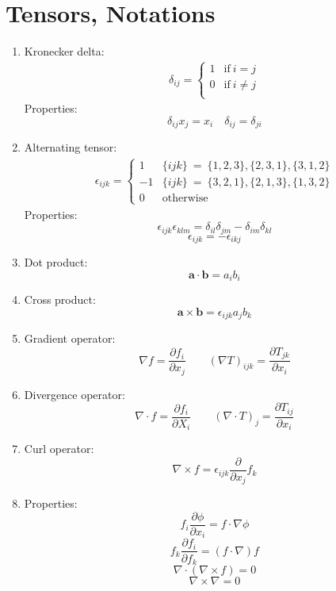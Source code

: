 \documentclass{article}
\begin{document}
\section{Tensors, Notations}
\begin{multicols}{2}
\begin{enumerate}

    \item Kronecker delta: 
    \begin{align*}
    \delta_{ij} = 
        \begin{cases}
            1 & \text{if} \ i=j \\
            0 & \text{if} \ i\neq j \\
        \end{cases}
    \end{align*}
    Properties:
    \[\delta_{ij}x_{j} = x_{i} \quad \delta_{ij}=\delta_{ji}\]
    
    \item Alternating tensor:
    \begin{align*}
    \epsilon_{ijk} = 
        \begin{cases}
            1 & \{ijk\} \ =\ \{1,2,3\}, \{2,3,1\}, \{3,1,2\} \\
            -1 & \{ijk\} \ =\ \{3,2,1\}, \{2,1,3\}, \{1,3,2\} \\
            0 & \text{otherwise}
        \end{cases}
    \end{align*}
    Properties:
    \[\epsilon_{ijk}\epsilon_{klm} = \delta_{il}\delta_{jm}-\delta_{im}\delta_{kl}\]
    \[\epsilon_{ijk} = -\epsilon_{ikj}\]
    
    \item Dot product: \[\mathbf{a} \cdot \mathbf{b} = a_{i}b_{i}\]
    
    \item Cross product: \[\mathbf{a} \times \mathbf{b} = \epsilon_{ijk}a_{j}b_{k}\]
    
    \item Gradient operator: \[\nabla f = \frac{\partial f_{i}}{\partial x_{j}} \quad \quad (\nabla T)_{ijk} = \frac{\partial T_{jk}}{\partial x_{i}}\]
    
    \item Divergence operator: \[\nabla \cdot f = \frac{\partial f_{i}}{\partial X_{i}} \quad \quad (\nabla \cdot T)_{j} = \frac{\partial T_{ij}}{\partial x_{i}}\]
    
    \item Curl operator: \[\nabla \times f = \epsilon_{ijk} \frac{\partial}{\partial x_{j}}f_{k} \]
    
    \item Properties:
    \[f_{i}\frac{\partial \phi}{\partial x_{i}} = f\cdot \nabla \phi\]
    \[f_{k}\frac{\partial f_{i}}{\partial f_{k}} = (f\cdot \nabla)f\]
    \[\nabla\cdot(\nabla \times f) = 0\]
    \[\nabla \times \nabla = 0\]

\end{enumerate}
\end{multicols}
\end{document}
